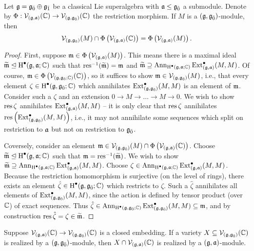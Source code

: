 \begin{proposition}
  Let $\g = \even{\g} \oplus \odd{\g}$ be a classical Lie superalgebra with $\a \leq \even{\g}$ a submodule. Denote by $\Phi: \V_{(\g,\a)}(\CC) \to \V_{(\g,\even{\g})}(\CC)$ the restriction morphism. If $M$ is a $(\g,\even{\g})$-module, then
  \[
    \V_{(\g,\even{\g})}(M) \cap \Phi\left(\V_{(\g,\a)}(\CC)\right) = \Phi\left(\V_{(\g,\a)}(M)\right).
  \]

\end{proposition}
\begin{proof}
  First, suppose $\m \in \Phi\left(\V_{(\g,\a)}(M)\right)$. This means there is a maximal ideal $\widetilde \m \trianglelefteq \H^\bullet(\g,\a;\CC)$ such that  $\resmap^{-1}(\widetilde \m) = \m$ and $\widetilde{\m} \supseteq \Ann_{\H^\bullet(\g,\a;\CC)}\Ext_{(\g,\a)}^\bullet(M,M)$. Of course, $\m \in \Phi\left(\V_{(\g,\even{\g};\CC)}(\CC)\right)$, so it suffices to show $\m \in \V_{(\g,\even{\g})}(M)$, i.e., that every element $\zeta \in \H^\bullet(\g,\even{\g};\CC)$ which annihilates $\Ext_{(\g,\even{\g})}^\bullet(M,M)$ is an element of $\m$. Consider such a $\zeta$ and an extension $0 \to M \to \ldots \to M \to 0$. We wish to show $\resmap \zeta$ annihilates $\Ext_{(\g,\a)}^\bullet(M,M)$ -- it is only clear that $\resmap \zeta$ annihilates $\resmap \left( \Ext_{(\g,\even{\g})}^\bullet (M,M)\right)$, i.e., it may not annihilate some sequences which split on restriction to $\a$ but not on restriction to $\even{\g}$.

  Coversely, consider an element $\m \in \V_{(\g,\even{\g})}(M) \cap \Phi\left(\V_{(\g,\a)}(\CC)\right)$. Choose $\widetilde{\m} \trianglelefteq \H^\bullet(\g,\a;\CC)$ such that $\m = \resmap^{-1}(\widetilde{\m})$. We wish to show $ \widetilde{\m} \supseteq \Ann_{\H^\bullet(\g,\a;\CC)}\Ext^\bullet_{(\g,\a)}(M,M)$. Choose $\zeta \in \Ann_{\H^\bullet(\g,\a;\CC)}\Ext_{(\g,\a)}^\bullet(M,M)$. Because the restriction homomorphism is surjective (on the level of rings), there exists an element $\hat \zeta \in \H^\bullet(\g,\even{\g};\CC)$ which restricts to $\zeta$. Such a $\hat \zeta$ annihilates all elements of $\Ext_{(\g,\even{\g})}^\bullet(M,M)$, since the action is defined by tensor product (over $\CC$) of exact sequences. Thus $\hat \zeta \in \Ann_{\H^\bullet(\g,\even{\g};\CC)}\Ext_{(\g,\even{\g})}^\bullet(M,M) \subseteq \m$, and by construction $\resmap \hat \zeta = \zeta \in \widetilde{\m}$.
\end{proof}


\begin{corollary}
  Suppose $\V_{(\g,\a)}(\CC) \to \V_{(\g,\even{\g})}(\CC)$ is a closed embedding. If a variety $X \subseteq \V_{(\g,\even{\g})}(\CC)$ is realized by a  $(\g,\even{\g})$-module, then $X \cap \V_{(\g,\a)}(\CC)$ is realized by a $(\g,\a)$-module.
\end{corollary}

